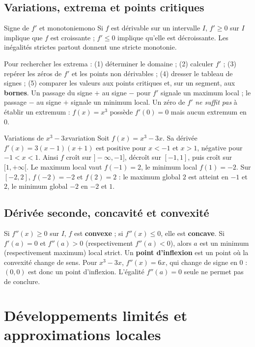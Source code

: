 \documentclass[11pt,a4paper,oneside]{article}
\begin{document}
\subsection{Variations, extrema et points critiques}
\begin{theoreme}{Signe de $f'$ et monotonie}{mono}
Si $f$ est dérivable sur un intervalle $I$, $f'\ge0$ sur $I$ implique que $f$ est croissante ; $f'\le0$ implique qu'elle est décroissante. Les inégalités strictes partout donnent une stricte monotonie.
\end{theoreme}
Pour rechercher les extrema : (1) déterminer le domaine ; (2) calculer $f'$ ; (3) repérer les zéros de $f'$ et les points non dérivables ; (4) dresser le tableau de signes ; (5) comparer les valeurs aux points critiques et, sur un segment, aux \textbf{bornes}.
Un passage du signe $+$ au signe $-$ pour $f'$ signale un maximum local ; le passage $-$ au signe $+$ signale un minimum local. Un zéro de $f'$ \emph{ne suffit pas} à établir un extremum : $f(x)=x^3$ possède $f'(0)=0$ mais aucun extremum en $0$.
\begin{exemple}{Variations de $x^3-3x$}{variation}
Soit $f(x)=x^3-3x$. Sa dérivée $f'(x)=3(x-1)(x+1)$ est positive pour $x<-1$ et $x>1$, négative pour $-1<x<1$.
Ainsi $f$ croît sur $]-\infty,-1]$, décroît sur $[-1,1]$, puis croît sur $[1,+\infty[$. Le maximum local vaut $f(-1)=2$, le minimum local $f(1)=-2$.
Sur $[-2,2]$, $f(-2)=-2$ et $f(2)=2$ : le maximum global $2$ est atteint en $-1$ et $2$, le minimum global $-2$ en $-2$ et $1$.
\end{exemple}

\subsection{Dérivée seconde, concavité et convexité}
Si $f''(x)\ge0$ sur $I$, $f$ est \textbf{convexe} ; si $f''(x)\le0$, elle est \textbf{concave}. Si $f'(a)=0$ et $f''(a)>0$ (respectivement $f''(a)<0$), alors $a$ est un minimum (respectivement maximum) local strict.
Un \textbf{point d'inflexion} est un point où la convexité change de sens. Pour $x^3-3x$, $f''(x)=6x$, qui change de signe en $0$ : $(0,0)$ est donc un point d'inflexion. L'égalité $f''(a)=0$ seule ne permet pas de conclure.

\section{Développements limités et approximations locales}
\end{document}
